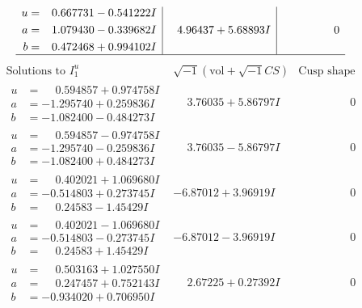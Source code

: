 \documentclass[1p]{elsarticle_modified}
\theoremstyle{definition}
\newcommand{\I}{\sqrt{-1}}
\begin{document}
$$\begin{array}{c|c|c}
\begin{aligned}
u &= \phantom{-}0.667731 - 0.541222 I \\
a &= \phantom{-}1.079430 - 0.339682 I \\
b &= \phantom{-}0.472468 + 0.994102 I\end{aligned}
 & \phantom{-}4.96437 + 5.68893 I & \phantom{-0.000000 } 0\\
 \hline 
 \end{array}$$\newpage$$\begin{array}{c|c|c}  
\text{Solutions to }I^u_{1}& \I (\text{vol} + \sqrt{-1}CS) & \text{Cusp shape}\\
 \hline 
\begin{aligned}
u &= \phantom{-}0.594857 + 0.974758 I \\
a &= -1.295740 + 0.259836 I \\
b &= -1.082400 - 0.484273 I\end{aligned}
 & \phantom{-}3.76035 + 5.86797 I & \phantom{-0.000000 } 0 \\ \hline\begin{aligned}
u &= \phantom{-}0.594857 - 0.974758 I \\
a &= -1.295740 - 0.259836 I \\
b &= -1.082400 + 0.484273 I\end{aligned}
 & \phantom{-}3.76035 - 5.86797 I & \phantom{-0.000000 } 0 \\ \hline\begin{aligned}
u &= \phantom{-}0.402021 + 1.069680 I \\
a &= -0.514803 + 0.273745 I \\
b &= \phantom{-}0.24583 - 1.45429 I\end{aligned}
 & -6.87012 + 3.96919 I & \phantom{-0.000000 } 0 \\ \hline\begin{aligned}
u &= \phantom{-}0.402021 - 1.069680 I \\
a &= -0.514803 - 0.273745 I \\
b &= \phantom{-}0.24583 + 1.45429 I\end{aligned}
 & -6.87012 - 3.96919 I & \phantom{-0.000000 } 0 \\ \hline\begin{aligned}
u &= \phantom{-}0.503163 + 1.027550 I \\
a &= \phantom{-}0.247457 + 0.752143 I \\
b &= -0.934020 + 0.706950 I\end{aligned}
 & \phantom{-}2.67225 + 0.27392 I & \phantom{-0.000000 } 0 \\ \hline\begin{aligned}

\end{aligned}
\end{array}$$
\end{document}
